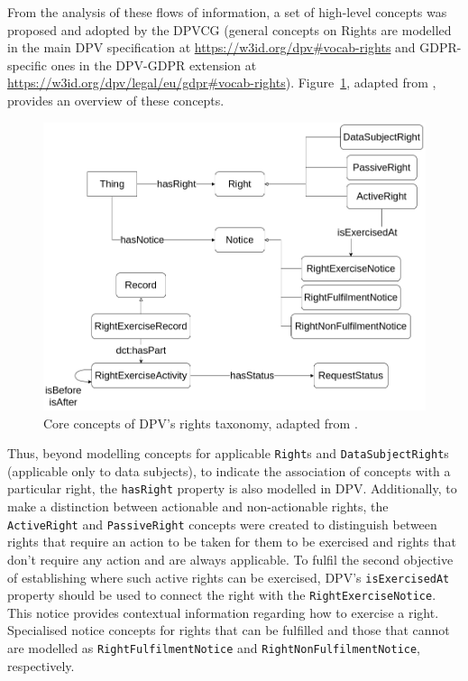 From the analysis of these flows of information, a set of high-level concepts was proposed and adopted by the DPVCG (general concepts on Rights are modelled in the main DPV specification at \url{https://w3id.org/dpv#vocab-rights} and GDPR-specific ones in the DPV-GDPR extension at \url{https://w3id.org/dpv/legal/eu/gdpr#vocab-rights}).
Figure~\ref{fig:rights_dpv}, adapted from \cite{pandit_primer_2022}, provides an overview of these concepts.

\begin{figure}[ht]
    \centering
    \includegraphics[width=0.8\linewidth]{figures/chapter-4/DPV-rights.png}
    \caption{Core concepts of DPV's rights taxonomy, adapted from \cite{pandit_primer_2022}.}
    \label{fig:rights_dpv}
\end{figure}

Thus, beyond modelling concepts for applicable \texttt{Right}s and \texttt{DataSubjectRight}s (applicable only to data subjects), to indicate the association of concepts with a particular right, the \texttt{hasRight} property is also modelled in DPV.
Additionally, to make a distinction between actionable and non-actionable rights, the \texttt{ActiveRight} and \texttt{PassiveRight} concepts were created to distinguish between rights that require an action to be taken for them to be exercised and rights that don't require any action and are always applicable.%
To fulfil the second objective of establishing where such active rights can be exercised, DPV's \texttt{isExercisedAt} property should be used to connect the right with the \texttt{RightExerciseNotice}.
This notice provides contextual information regarding how to exercise a right.
Specialised notice concepts for rights that can be fulfilled and those that cannot are modelled as \texttt{RightFulfilmentNotice} and \texttt{RightNonFulfilmentNotice}, respectively.

